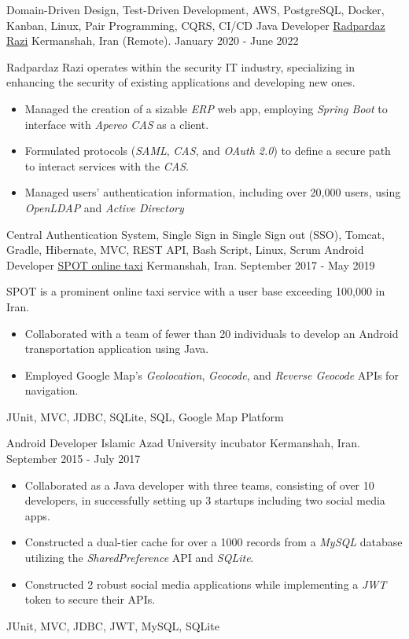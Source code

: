 \begin{experiences}
{\begin{itemize}
   \end{itemize}}{Domain-Driven Design, Test-Driven Development, AWS, PostgreSQL, Docker, Kanban, Linux, Pair Programming, CQRS, CI/CD}
  \emptySeparator 
\experience
{}
{Java Developer}
{\href{https://raadpardaz.ir/}{Radpardaz Razi}}
{Kermanshah, Iran {\scriptsize{(Remote)}}. \hspace{150 pt} January 2020 - June 2022}
{}
{
\par{Radpardaz Razi operates within the security IT industry, specializing in enhancing the security of existing applications and developing new ones.}
\begin{itemize}
\item Managed the creation of a sizable \emph{ERP} web app, employing \emph{Spring Boot} to interface with \emph{Apereo CAS} as a client.
\item Formulated protocols (\emph{SAML}, \emph{CAS}, and \emph{OAuth 2.0}) to define a secure path to interact services with the \textit{CAS}.
\item Managed users' authentication information, including over 20,000 users, using \emph{OpenLDAP} and \emph{Active Directory}
\end{itemize}
}{Central Authentication System, Single Sign in Single Sign out (SSO), Tomcat, Gradle, Hibernate, MVC, REST API, Bash Script, Linux, Scrum}
\emptySeparator
\experience
  {}
  {Android Developer}
  {\href{https://www.spotbar.ir/}{SPOT online taxi}}
  {Kermanshah, Iran. \hspace{140 pt} September 2017 - May 2019}
  {}
  {
  SPOT is a prominent online taxi service with a user base exceeding 100,000 in Iran. 
  \begin{itemize}
    \item Collaborated with a team of fewer than 20 individuals to develop an Android transportation application using Java.
    \item Employed Google Map's \emph{Geolocation}, \emph{Geocode}, and \emph{Reverse Geocode} APIs for navigation.\end{itemize}
  }{JUnit, MVC, JDBC, SQLite, SQL, Google Map Platform}

\emptySeparator

\experience
{}
{Android Developer}
{Islamic Azad University incubator}
{Kermanshah, Iran. \hspace{60 pt} September 2015 - July 2017}
{}
{
\begin{itemize}
\item Collaborated as a Java developer with three teams, consisting of over 10 developers, in successfully setting up 3 startups including two social media apps.
\item Constructed a dual-tier cache for over a 1000 records from a \emph{MySQL} database utilizing the \emph{SharedPreference} API and \emph{SQLite}.
\item Constructed 2 robust social media applications while implementing a \emph{JWT} token to secure their APIs.
\end{itemize}
}{JUnit, MVC, JDBC, JWT, MySQL, SQLite}
\end{experiences}